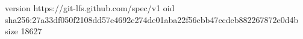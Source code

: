 version https://git-lfs.github.com/spec/v1
oid sha256:27a33df050f2108dd57e4692c274de01aba22f56cbb47ccdeb882267872e0d4b
size 18627
